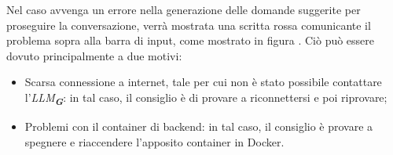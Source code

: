 Nel caso avvenga un errore nella generazione delle domande suggerite per proseguire la conversazione, verrà mostrata una scritta rossa comunicante il problema sopra alla barra di input, come mostrato in figura . Ciò può essere dovuto principalmente a due motivi:
\begin{itemize}
    \item Scarsa connessione a internet, tale per cui non è stato possibile contattare l'\emph{LLM}\textsubscript{\textbf{\textit{G}}}: in tal caso, il consiglio è di provare a riconnettersi e poi riprovare;
    \item Problemi con il container di backend: in tal caso, il consiglio è provare a spegnere e riaccendere l'apposito container in Docker.
\end{itemize}


